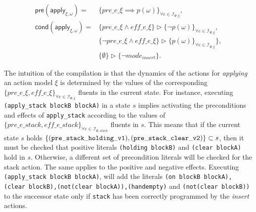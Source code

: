 \documentclass{article}
\newcommand{\pre}{\mathsf{pre}}     %
\newcommand{\cond}{\mathsf{cond}}   %
\begin{document}
\begin{small}
\begin{align*}
\pre(\mathsf{apply_{\xi,\omega}})=&\{pre\_e\_\xi\implies p(\omega)\}_{\forall e\in{\mathcal I}_{\Psi,\xi}},\\
\cond(\mathsf{apply_{\xi,\omega}})=&\{pre\_e\_\xi\wedge eff\_e\_\xi\}\rhd\{\neg p(\omega)\}_{\forall e\in{\mathcal I}_{\Psi,\xi}},\\
&\{\neg pre\_e\_\xi \wedge eff\_e\_\xi\}\rhd\{p(\omega)\}_{\forall e\in{\mathcal I}_{\Psi,\xi}}\},\\
&\{\emptyset\}\rhd\{\neg mode_{insert}\}.
\end{align*}
\end{small}

The intuition of the compilation is that the dynamics of the actions for {\em applying} an action model $\xi$ is determined by the values of the corresponding $\{pre\_e\_\xi, eff\_e\_\xi\}_{\forall e\in{\mathcal I}_{\Psi,\xi}}$ fluents in the current state. For instance, executing {\tt{\small (apply\_stack blockB blockA)}} in a state $s$ implies activating the preconditions and effects of {\tt{\small apply\_stack}} according to the values of $\{pre\_e\_stack, eff\_e\_stack\}_{\forall e\in{\mathcal I}_{\Psi,stack}}$ fluents in $s$. This means that if the current state $s$ holds $\{{\tt\scriptsize (pre\_stack\_holding\_v1),(pre\_stack\_clear\_v2)}\} \subset s$, then it must be checked that positive literals {\tt{\small (holding blockB)}} and {\tt{\small (clear blockA)}} hold in $s$. Otherwise, a different set of precondition literals will be checked for the stack action. The same applies to the positive and negative effects. Executing {\tt{\small (apply\_stack blockB blockA)}}, will add the literals {\tt{\small (on blockB blockA),(clear blockB),(not(clear blockA)),(handempty)}} and {\tt{\small(not(clear blockB))}} to the successor state only if {\tt{\small stack}} has been correctly programmed by the {\em insert} actions.
\end{document}
